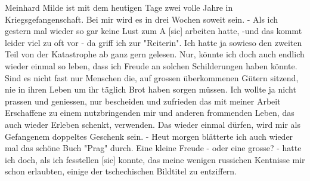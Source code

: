 \def\day{19. Mai 1942.{\color{red} [sic] }}
\mktitle

Meinhard Milde ist mit dem heutigen Tage zwei volle Jahre in Kriegsgefangenschaft.
Bei mir wird es in drei Wochen soweit sein.
- Als ich gestern mal wieder so gar keine Lust zum A{\color{red} [sic] } arbeiten hatte, -und das kommt leider viel zu oft vor - da griff ich zur "Reiterin".
Ich hatte ja sowieso den zweiten Teil von der Katastrophe ab ganz gern gelesen.
Nur, k\"{o}nnte ich doch auch endlich wieder einmal so leben, dass ich Freude an solchen Schilderungen haben k\"{o}nnte.
Sind es nicht fast nur Menschen die, auf grossen \"{u}berkommenen G\"{u}tern sitzend, nie in ihren Leben um ihr t\"{a}glich Brot haben sorgen m\"{u}ssen.
Ich wollte ja nicht prassen und geniessen, nur bescheiden und zufrieden das mit meiner Arbeit Erschaffene zu einem nutzbringenden mir und anderen frommenden Leben, das auch wieder Erleben schenkt, verwenden.
Das wieder einmal d\"{u}rfen, wird mir als Gefangenem doppeltes Geschenk sein.
- Heut morgen bl\"{a}tterte ich auch wieder mal das sch\"{o}ne Buch "Prag" durch.
Eine kleine Freude - oder eine grosse? - hatte ich doch, als ich fesstellen{\color{red} [sic] } konnte, das meine wenigen russichen Kentnisse mir schon erlaubten, einige der tschechischen Bildtitel zu entziffern.

\clearpage
